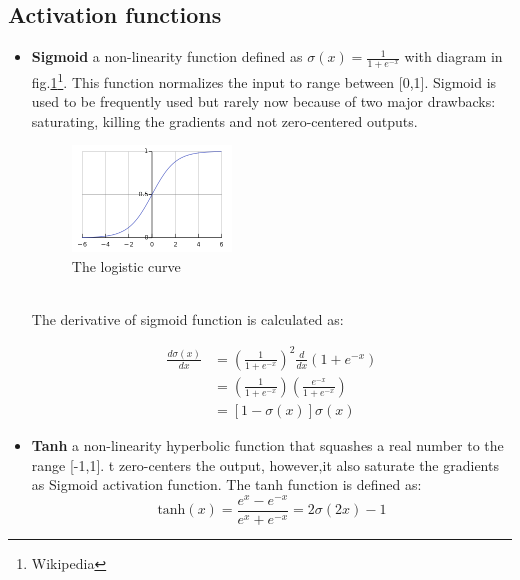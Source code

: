\subsection{Activation functions}
\begin{itemize}
    \item \textbf{Sigmoid} a non-linearity function defined as $\sigma(x)=\frac{1}{1 + e^{-x}}$ with diagram in fig.\ref{fig:sigmoid}\footnote{Wikipedia}.
     This function normalizes the input to range between [0,1]. Sigmoid is used to be frequently
     used but rarely now because of two major drawbacks: saturating, killing the gradients and not zero-centered outputs.\cite{cs231n}\\
    \begin{figure}[h!]
        \centering
        \includegraphics[width=0.4\textwidth]{Chapters/Fig/sigmoid.png}
        \caption{The logistic curve}
        \label{fig:sigmoid}
    \end{figure}\\
    The derivative of sigmoid function is calculated as:
    \begin{center}
        \begin{equation}
            \begin{split}
                \frac{d\sigma(x)}{dx} & = (\frac{1}{1+e^{-x}})^2\frac{d}{dx}(1+e^{-x})\\
                                    & = (\frac{1}{1+e^{-x}})(\frac{e^{-x}}{1+e^{-x}})\\
                                    & = [1-\sigma(x)]\sigma(x)
            \end{split}
        \end{equation}
    \end{center}
    \item \textbf{Tanh} a non-linearity hyperbolic function that squashes a real number to the range [-1,1]. 
    t zero-centers the output, however,it also saturate the gradients as Sigmoid activation function\cite{cs231n}. The tanh function is defined as:
    \begin{equation}
        \text{tanh}(x) = \frac{e^x - e^{-x}}{e^x + e^{-x}} = 2\sigma(2x) - 1

\end{equation}
\end{itemize}
